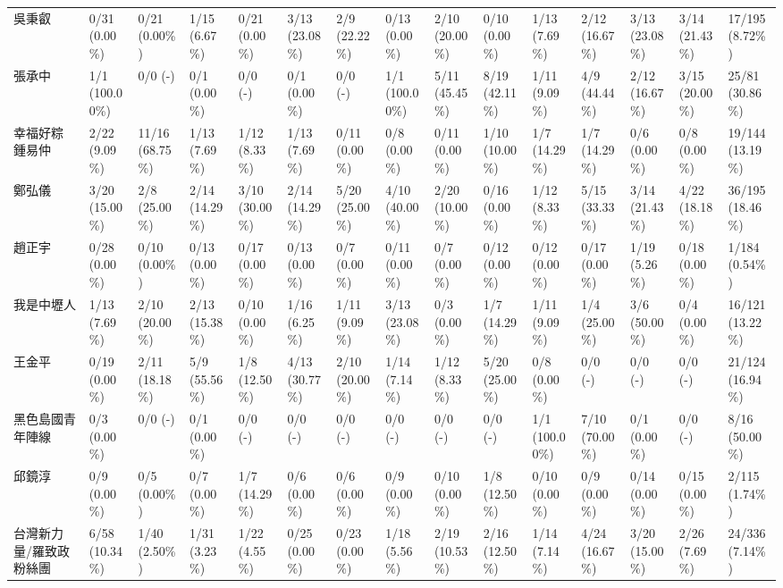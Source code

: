 \documentclass[letterpaper, 10pt, conference]{ieeeconf}   %
\begin{document}
\begin{CJK}{UTF8}{bsmi}
\begin{landscape}
\begin{longtable}[c]{@{}L{2.45cm}L{1.1cm}L{1.1cm}L{1.1cm}L{1.1cm}L{1.1cm}L{1.1cm}L{1.1cm}L{1.1cm}L{1.1cm}L{1.1cm}L{1.1cm}L{1.1cm}L{1.1cm}L{1.1cm}@{}}
吳秉叡 & 0/31 (0.00\%) & 0/21 (0.00\%) & 1/15 (6.67\%) & 0/21 (0.00\%) & 3/13 (23.08\%) & 2/9 (22.22\%) & 0/13 (0.00\%) & 2/10 (20.00\%) & 0/10 (0.00\%) & 1/13 (7.69\%) & 2/12 (16.67\%) & 3/13 (23.08\%) & 3/14 (21.43\%) & 17/195 (8.72\%) \\
張承中 & 1/1 (100.00\%) & 0/0 (-) & 0/1 (0.00\%) & 0/0 (-) & 0/1 (0.00\%) & 0/0 (-) & 1/1 (100.00\%) & 5/11 (45.45\%) & 8/19 (42.11\%) & 1/11 (9.09\%) & 4/9 (44.44\%) & 2/12 (16.67\%) & 3/15 (20.00\%) & 25/81 (30.86\%) \\
幸福好粽 鍾易仲 & 2/22 (9.09\%) & 11/16 (68.75\%) & 1/13 (7.69\%) & 1/12 (8.33\%) & 1/13 (7.69\%) & 0/11 (0.00\%) & 0/8 (0.00\%) & 0/11 (0.00\%) & 1/10 (10.00\%) & 1/7 (14.29\%) & 1/7 (14.29\%) & 0/6 (0.00\%) & 0/8 (0.00\%) & 19/144 (13.19\%) \\
鄭弘儀 & 3/20 (15.00\%) & 2/8 (25.00\%) & 2/14 (14.29\%) & 3/10 (30.00\%) & 2/14 (14.29\%) & 5/20 (25.00\%) & 4/10 (40.00\%) & 2/20 (10.00\%) & 0/16 (0.00\%) & 1/12 (8.33\%) & 5/15 (33.33\%) & 3/14 (21.43\%) & 4/22 (18.18\%) & 36/195 (18.46\%) \\
趙正宇 & 0/28 (0.00\%) & 0/10 (0.00\%) & 0/13 (0.00\%) & 0/17 (0.00\%) & 0/13 (0.00\%) & 0/7 (0.00\%) & 0/11 (0.00\%) & 0/7 (0.00\%) & 0/12 (0.00\%) & 0/12 (0.00\%) & 0/17 (0.00\%) & 1/19 (5.26\%) & 0/18 (0.00\%) & 1/184 (0.54\%) \\
我是中壢人 & 1/13 (7.69\%) & 2/10 (20.00\%) & 2/13 (15.38\%) & 0/10 (0.00\%) & 1/16 (6.25\%) & 1/11 (9.09\%) & 3/13 (23.08\%) & 0/3 (0.00\%) & 1/7 (14.29\%) & 1/11 (9.09\%) & 1/4 (25.00\%) & 3/6 (50.00\%) & 0/4 (0.00\%) & 16/121 (13.22\%) \\
王金平 & 0/19 (0.00\%) & 2/11 (18.18\%) & 5/9 (55.56\%) & 1/8 (12.50\%) & 4/13 (30.77\%) & 2/10 (20.00\%) & 1/14 (7.14\%) & 1/12 (8.33\%) & 5/20 (25.00\%) & 0/8 (0.00\%) & 0/0 (-) & 0/0 (-) & 0/0 (-) & 21/124 (16.94\%) \\
黑色島國青年陣線 & 0/3 (0.00\%) & 0/0 (-) & 0/1 (0.00\%) & 0/0 (-) & 0/0 (-) & 0/0 (-) & 0/0 (-) & 0/0 (-) & 0/0 (-) & 1/1 (100.00\%) & 7/10 (70.00\%) & 0/1 (0.00\%) & 0/0 (-) & 8/16 (50.00\%) \\
邱鏡淳 & 0/9 (0.00\%) & 0/5 (0.00\%) & 0/7 (0.00\%) & 1/7 (14.29\%) & 0/6 (0.00\%) & 0/6 (0.00\%) & 0/9 (0.00\%) & 0/10 (0.00\%) & 1/8 (12.50\%) & 0/10 (0.00\%) & 0/9 (0.00\%) & 0/14 (0.00\%) & 0/15 (0.00\%) & 2/115 (1.74\%) \\
台灣新力量/羅致政粉絲團 & 6/58 (10.34\%) & 1/40 (2.50\%) & 1/31 (3.23\%) & 1/22 (4.55\%) & 0/25 (0.00\%) & 0/23 (0.00\%) & 1/18 (5.56\%) & 2/19 (10.53\%) & 2/16 (12.50\%) & 1/14 (7.14\%) & 4/24 (16.67\%) & 3/20 (15.00\%) & 2/26 (7.69\%) & 24/336 (7.14\%) \\

\end{longtable}
\end{landscape}
\end{CJK}
\end{document}
